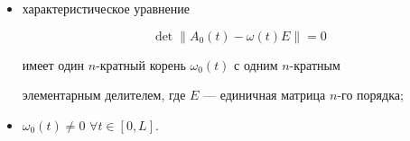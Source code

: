 \begin{itemize}
($s=0,1,\dotsc$) бесконечно дифференцируемы на отрезке $[0,L]$;


\item[4)] характеристическое уравнение


\begin{equation*}


\det\|A_{0}(t)-\omega (t)E\|=0


\end{equation*}


имеет один $n$-кратный корень $\omega_{0}(t)$ с одним $n$-кратным


элементарным делителем, где $E$ --- единичная матрица $n$-го порядка;


\item[5)] $\omega_{0}(t)\neq 0$ $\forall t \in [0,L]$.


\end{itemize}








